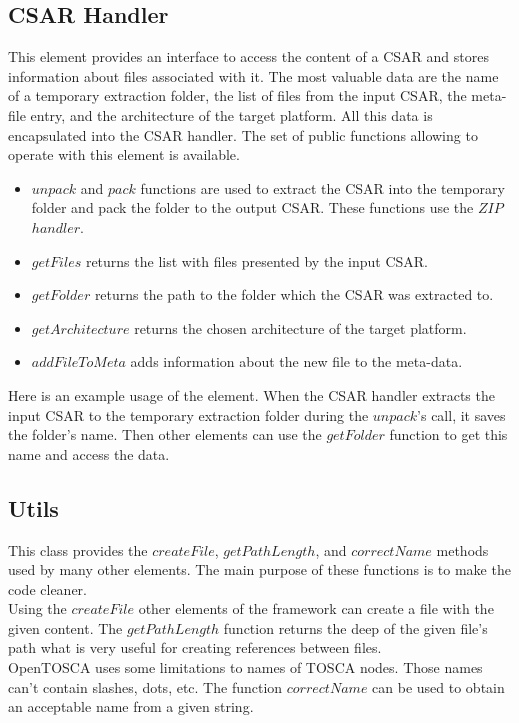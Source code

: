 \subsection*{CSAR Handler}
This element provides an interface to access the content of a CSAR and stores information about files associated with it.
The most valuable data are the name of a temporary extraction folder, the list of files from the input CSAR, the meta-file entry, and the architecture of the target platform.
All this data is encapsulated into the CSAR handler.
The set of public functions allowing to operate with this element is available.
\begin{itemize}
	\item $unpack$ and $pack$ functions are used to extract the CSAR into the temporary folder and pack the folder to the output CSAR. 
	These functions use the $ZIP$~$handler$.
	\item $getFiles$ returns the list with files presented by the input CSAR.
	\item $getFolder$ returns the path to the folder which the CSAR was extracted to.
	\item $getArchitecture$ returns the chosen architecture of the target platform.
	\item $addFileToMeta$ adds information about the new file to the meta-data.
\end{itemize}
Here is an example usage of the element.
When the CSAR handler extracts the input CSAR to the temporary extraction folder during the $unpack$'s call, it saves the folder's name. 
Then other elements can use the $getFolder$ function to get this name and access the data.

\subsection*{Utils}
This class provides the $createFile$, $getPathLength$, and $correctName$ methods used by many other elements.
The main purpose of these functions is to make the code cleaner. \\
Using the $createFile$ other elements of the framework can create a file with the given content.
The $getPathLength$ function returns the deep of the given file's path what is very useful for creating references between files.\\
OpenTOSCA uses some limitations to names of TOSCA nodes. 
Those names can't contain slashes, dots, etc.
The function $correctName$ can be used to obtain an acceptable name from a given string.

